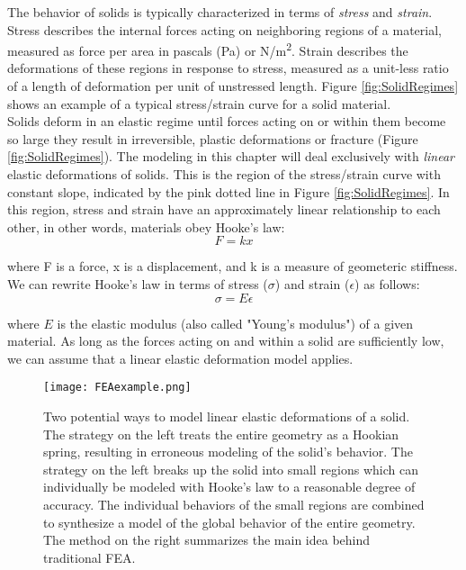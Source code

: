 {The behavior of solids is typically characterized in terms of \textit{stress} and \textit{strain}.  Stress describes the internal forces acting on neighboring regions of a material, measured as force per area in pascals (Pa) or N/m\textsuperscript{2}.  Strain describes the deformations of these regions in response to stress, measured as a unit-less ratio of a length of deformation per unit of unstressed length.  Figure \ref{fig:SolidRegimes} shows an example of a typical stress/strain curve for a solid material.\\

Solids deform in an elastic regime until forces acting on or within them become so large they result in irreversible, plastic deformations or fracture (Figure \ref{fig:SolidRegimes}).  The modeling in this chapter will deal exclusively with \textit{linear} elastic deformations of solids.  This is the region of the stress/strain curve with constant slope, indicated by the pink dotted line in Figure \ref{fig:SolidRegimes}.  In this region, stress and strain have an approximately linear relationship to each other, in other words, materials obey Hooke's law:
\[F = kx\]

where F is a force, x is a displacement, and k is a measure of geometeric stiffness.  We can rewrite Hooke's law in terms of stress ($\sigma$) and strain ($\epsilon$) as follows:
\begin{equation}\label{eq:stressstrain}
\sigma = E\epsilon 
\end{equation}

where $E$ is the elastic modulus (also called "Young's modulus") of a given material.  As long as the forces acting on and within a solid are sufficiently low, we can assume that a linear elastic deformation model applies.\\

\begin{figure}
  \texttt{[image: FEAexample.png]}
  \caption{Two potential ways to model linear elastic deformations of a solid.  The strategy on the left treats the entire geometry as a Hookian spring, resulting in erroneous modeling of the solid's behavior.  The strategy on the left breaks up the solid into small regions which can individually be modeled with Hooke's law to a reasonable degree of accuracy.  The individual behaviors of the small regions are combined to synthesize a model of the global behavior of the entire geometry.  The method on the right summarizes the main idea behind traditional FEA.}
  \label{fig:FEAexample}
\end{figure}

}
